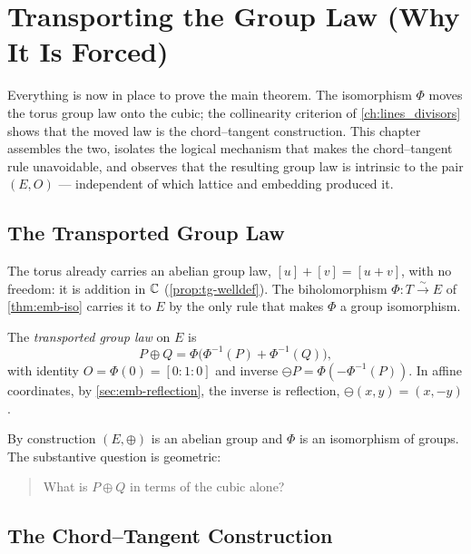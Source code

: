 \chapter{Transporting the Group Law (Why It Is Forced)}
\label{ch:transport}

Everything is now in place to prove the main theorem. The isomorphism \(\Phi\)
moves the torus group law onto the cubic; the collinearity criterion of
\cref{ch:lines_divisors} shows that the moved law is the chord--tangent
construction. This chapter assembles the two, isolates the logical mechanism that
makes the chord--tangent rule unavoidable, and observes that the resulting group
law is intrinsic to the pair \((E, O)\) --- independent of which lattice and
embedding produced it.

\section{The Transported Group Law}
\label{sec:tr-transported}

The torus already carries an abelian group law, \([u] + [v] = [u+v]\), with no
freedom: it is addition in \(\mathbb{C}\) (\cref{prop:tg-welldef}). The biholomorphism
\(\Phi : T \xrightarrow{\sim} E\) of \cref{thm:emb-iso} carries it to \(E\) by the
only rule that makes \(\Phi\) a group isomorphism.

\begin{definition}
\label{def:tr-law}
The \emph{transported group law} on \(E\) is
\[
  P \oplus Q = \Phi\bigl( \Phi^{-1}(P) + \Phi^{-1}(Q) \bigr),
\]
with identity \(O = \Phi(0) = [0:1:0]\) and inverse \(\ominus P = \Phi(-\Phi^{-1}(P))\).
In affine coordinates, by \cref{sec:emb-reflection}, the inverse is reflection,
\(\ominus(x, y) = (x, -y)\).
\end{definition}

By construction \((E, \oplus)\) is an abelian group and \(\Phi\) is an
isomorphism of groups. The substantive question is geometric:

\begin{quote}
What is \(P \oplus Q\) in terms of the cubic alone?
\end{quote}

\section{The Chord--Tangent Construction}
\label{sec:tr-chord-tangent}

